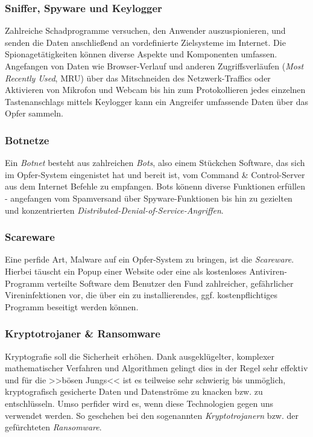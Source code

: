 \subsubsection{Sniffer, Spyware und Keylogger}
\label{sec:SnifferSpywareKeylogger}

Zahlreiche Schadprogramme versuchen, den Anwender auszuspionieren, und senden die Daten anschließend an vordefinierte Zielsysteme im Internet. Die Spionagetätigkeiten können diverse Aspekte und Komponenten umfassen. Angefangen von Daten wie Browser-Verlauf und anderen Zugriffsverläufen (\textit{Most Recently Used}, MRU) über das Mitschneiden des Netzwerk-Traffics oder Aktivieren von Mikrofon und Webcam bis hin zum Protokollieren jedes einzelnen Tastenanschlags mittels Keylogger kann ein Angreifer umfassende Daten über das Opfer sammeln.

\subsubsection{Botnetze}
\label{sec:Botnetze}

Ein \textit{Botnet} besteht aus zahlreichen \textit{Bots}, also einem Stückchen Software, das sich im Opfer-System eingenistet hat und bereit ist, vom Command \& Control-Server aus dem Internet Befehle zu empfangen. Bots könenn diverse Funktionen erfüllen - angefangen vom Spamversand über Spyware-Funktionen bis hin zu gezielten und konzentrierten \textit{Distributed-Denial-of-Service-Angriffen}.

\subsubsection{Scareware}
\label{sec:Scareware}

Eine perfide Art, Malware auf ein Opfer-System zu bringen, ist die \textit{Scareware}. Hierbei täuscht ein Popup einer Website oder eine als kostenloses Antiviren-Programm verteilte Software dem Benutzer den Fund zahlreicher, gefährlicher Vireninfektionen vor, die über ein zu installierendes, ggf. kostenpflichtiges Programm beseitigt werden können.


\subsubsection{Kryptotrojaner \& Ransomware}
\label{sec:Ransomware}

Kryptografie soll die Sicherheit erhöhen. Dank ausgeklügelter, komplexer mathematischer Verfahren und Algorithmen gelingt dies in der Regel sehr effektiv und für die >>bösen Jungs<< ist es teilweise sehr schwierig bis unmöglich, kryptografisch gesicherte Daten und Datenströme zu knacken bzw. zu entschlüsseln. Umso perfider wird es, wenn diese Technologien gegen uns verwendet werden. So geschehen bei den sogenannten \textit{Kryptotrojanern} bzw. der gefürchteten \textit{Ransomware}.

